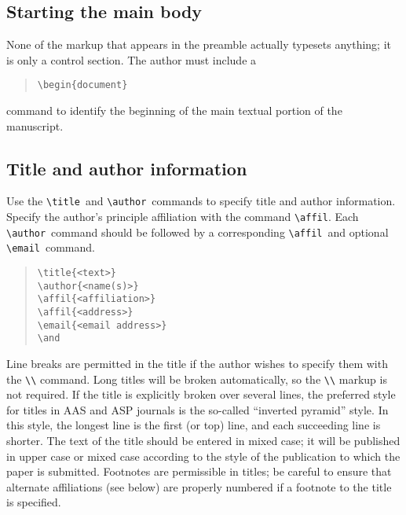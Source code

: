 \documentclass[preprint2]{aastex}
\begin{document}
\subsection{Starting the main body} 
 
None of the markup that appears in the preamble actually typesets 
anything; it is only a control section. 
The author must include a 
\begin{quote} 
\begin{verbatim} 
\begin{document} 
\end{verbatim} 
\end{quote} 
command to identify the beginning of the main textual 
portion of the manuscript. 
 
\subsection{Title and author information} \label{titlepage} 
 
Use the 
\verb"\title"\ 
 and \verb"\author"\  commands to specify title 
and author information. 
Specify the author's principle affiliation with 
the command \verb"\affil". 
Each \verb"\author"\ 
 command 
should be followed by a corresponding \verb"\affil"\ 
and optional \verb"\email"\  command. 
\begin{quote} 
\begin{verbatim} 
\title{<text>} 
\author{<name(s)>} 
\affil{<affiliation>} 
\affil{<address>} 
\email{<email address>} 
\and 
\end{verbatim} 
\end{quote} 
 
Line breaks are permitted in the title if the author wishes 
to specify them with the \verb"\\" command.  Long titles will 
be broken automatically, so the \verb"\\" markup is not required. 
If the title is explicitly broken over several lines, the 
preferred style for titles in AAS and ASP journals is the so-called 
``inverted pyramid'' style.  In this style, the longest line 
is the first (or top) line, and each succeeding line is shorter. 
The text of the title should be entered in mixed case; 
it will be published in upper case or mixed case according to 
the style of the publication to which the paper is submitted. 
Footnotes are permissible in titles; be careful to ensure that 
alternate affiliations (see below) are properly numbered if a 
footnote to the title is specified. 
 
\end{document}
